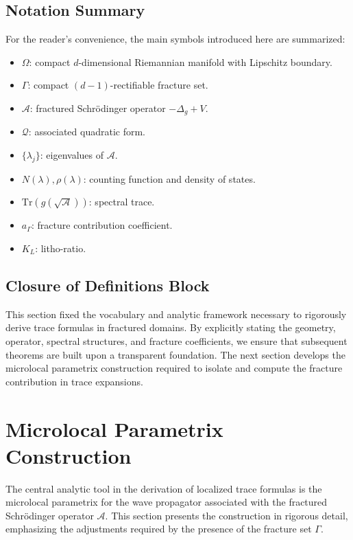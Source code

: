 \subsection{Notation Summary}

For the reader’s convenience, the main symbols introduced here are summarized:

\begin{itemize}
  \item $\Omega$: compact $d$-dimensional Riemannian manifold with Lipschitz boundary.
  \item $\Gamma$: compact $(d-1)$-rectifiable fracture set.
  \item $\mathcal{A}$: fractured Schrödinger operator $-\Delta_g + V$.
  \item $\mathcal{Q}$: associated quadratic form.
  \item $\{ \lambda_j \}$: eigenvalues of $\mathcal{A}$.
  \item $N(\lambda), \rho(\lambda)$: counting function and density of states.
  \item $\mathrm{Tr}(g(\sqrt{\mathcal{A}}))$: spectral trace.
  \item $a_\Gamma$: fracture contribution coefficient.
  \item $K_L$: litho-ratio.
\end{itemize}

\subsection*{Closure of Definitions Block}

This section fixed the vocabulary and analytic framework necessary to rigorously derive trace formulas in fractured domains. By explicitly stating the geometry, operator, spectral structures, and fracture coefficients, we ensure that subsequent theorems are built upon a transparent foundation. The next section develops the microlocal parametrix construction required to isolate and compute the fracture contribution in trace expansions.

\section{Microlocal Parametrix Construction}
\label{sec:parametrix}

The central analytic tool in the derivation of localized trace formulas
is the microlocal parametrix for the wave propagator associated with the
fractured Schrödinger operator $\mathcal{A}$. This section presents the
construction in rigorous detail, emphasizing the adjustments required by
the presence of the fracture set $\Gamma$. 

